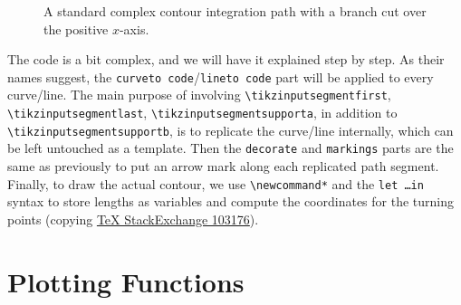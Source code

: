 \begin{figure}
    \centering
    \caption{A standard complex contour integration path with a branch cut over the positive $x$-axis.}
    \label{fig:complexcontour}
\end{figure}
The code is a bit complex, and we will have it explained step by step. As their names suggest, the \texttt{curveto code}/\texttt{lineto code} part will be applied to every curve/line. The main purpose of involving \texttt{\textbackslash tikzinputsegmentfirst}, \texttt{\textbackslash tikzinputsegmentlast}, \texttt{\textbackslash tikzinputsegmentsupporta}, in addition to \texttt{\textbackslash tikzinputsegmentsupportb}, is to replicate the curve/line internally, which can be left untouched as a template. Then the \texttt{decorate} and \texttt{markings} parts are the same as previously to put an arrow mark along each replicated path segment. Finally, to draw the actual contour, we use \texttt{\textbackslash newcommand*} and the \texttt{let \ldots in} syntax to store lengths as variables and compute the coordinates for the turning points (copying \href{https://tex.stackexchange.com/questions/103176/drawing-complex-integration}{\TeX{} StackExchange 103176}).

\section{Plotting Functions}

